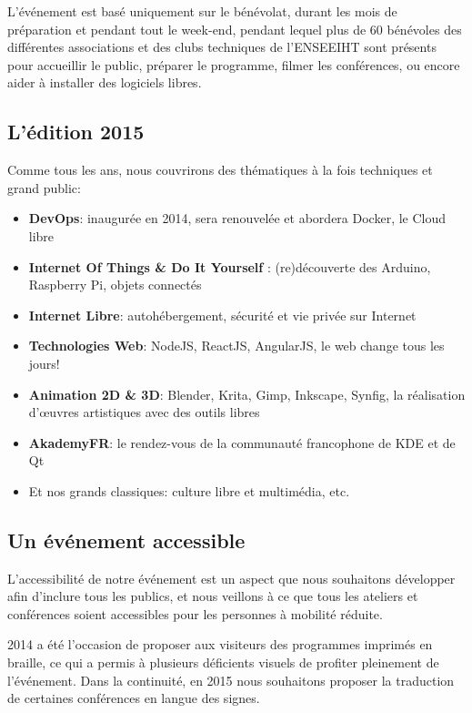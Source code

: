 \Separateur

L'événement est basé uniquement sur le bénévolat, durant les mois 
de préparation et pendant tout le week-end, pendant lequel plus de 60 
bénévoles des différentes associations et des clubs techniques de l'ENSEEIHT
sont présents pour accueillir le public, préparer le 
programme, filmer les conférences, ou encore aider à installer des 
logiciels libres.

\subsection{L'édition 2015}

Comme tous les ans, nous couvrirons des thématiques à la fois techniques et grand 
public:

\begin{itemize}[label=$\bullet$]
\item \textbf{DevOps}: inaugurée en 2014, sera renouvelée et abordera Docker, le Cloud libre
\item \textbf{Internet Of Things \& Do It Yourself} : (re)découverte des Arduino, Raspberry Pi, objets connectés
\item \textbf{Internet Libre}: autohébergement, sécurité et vie privée sur Internet
\item \textbf{Technologies Web}: NodeJS, ReactJS, AngularJS, le web change tous les jours!
\item \textbf{Animation 2D \& 3D}: Blender, Krita, Gimp, Inkscape, Synfig, la réalisation d'œuvres artistiques avec des outils libres
\item \textbf{AkademyFR}: le rendez-vous de la communauté francophone de KDE et de Qt
\item Et nos grands classiques: culture libre et multimédia, etc.
\end{itemize}

\subsection{Un événement accessible}

\begin{minipage}{0.38\textwidth}
\begin{center}
\end{center}
\end{minipage}
\begin{minipage}{0.62\textwidth}
L'accessibilité de notre événement est un aspect que nous souhaitons
 développer afin d'inclure tous les publics, et nous veillons à ce que
 tous les ateliers et conférences soient accessibles pour les personnes
 à mobilité réduite.

2014 a été l'occasion de proposer aux visiteurs des programmes
 imprimés en braille, ce qui a permis à plusieurs déficients visuels
 de profiter pleinement de l'événement. Dans la continuité, en 2015
 nous souhaitons proposer la traduction de certaines conférences en
 langue des signes.
\end{minipage}

